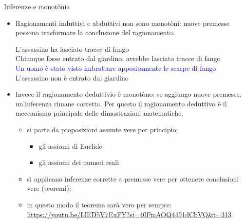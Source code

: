 \documentclass[aspectratio=169,10pt,dvipsnames,handout]{beamer}
\begin{document}
\begin{frame}{Inferenze e monot\`onia}
	\begin{itemize}
		\item Ragionamenti induttivi e abduttivi \alert{non sono monot\`oni}: nuove premesse possono trasformare la conclusione del ragionamento.
		      \begin{center}
			      \begin{inference}
				      L'assassino ha lasciato tracce di fango\\
				      Chiunque fosse entrato dal giardino, avrebbe lasciato tracce di fango\\
				      \textcolor{blue}{Un uomo è stato visto imbrattare appositamente le scarpe di fango}\\
				      \hline
				      L'assassino non è entrato dal giardino
			      \end{inference}
		      \end{center}

		\item Invece il ragionamento deduttivio \alert{è monot\`ono}: se aggiungo nuove premesse, un'inferenza rimane corretta. Per questo il ragionamento deduttivo è il meccanismo principale delle \alert{dimostrazioni matematiche}.
		\begin{itemize}
			\item si parte da proposizioni assunte vere per principio;
			\begin{itemize}
				\item gli assiomi di Euclide
				\item gli assiomi dei numeri reali
			\end{itemize}
			\item si applicano inferenze corrette a premesse vere per ottenere conclusioni vere (teoremi);
			\item in questo modo il teorema sarà vero per sempre:\\
		      \medskip \textcolor{blue}{\url{https://youtu.be/LlED5V7EuFY?si=40FmAOQ4491dCbVQ&t=313}}
		\end{itemize}
	\end{itemize}
\end{frame}
\end{document}
